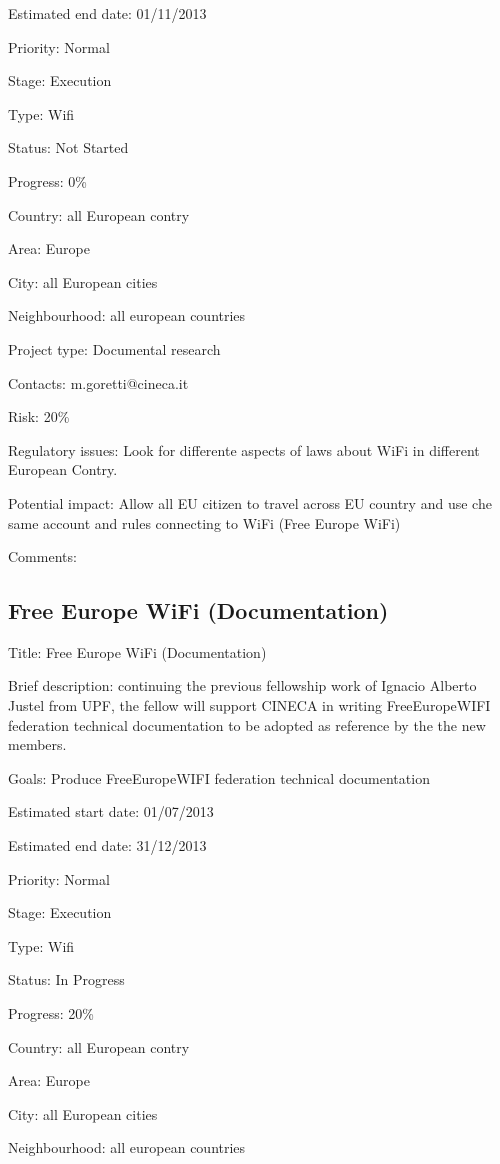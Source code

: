\documentclass[draftclsnofoot,12pt,journal,onecolumn]{IEEEtran}
\begin{document}
Estimated end date: 01/11/2013 

Priority: Normal 

Stage: Execution 

Type: Wifi 

Status: Not Started 

Progress: 0\% 

Country: all European contry 

Area: Europe 

City: all European cities 

Neighbourhood: all european countries 

Project type: Documental research 

Contacts: m.goretti@cineca.it

Risk: 20\% 

Regulatory issues: Look for differente aspects of laws about WiFi in 
different European Contry. 

Potential impact: Allow all EU citizen to travel across EU country and use 
che same account and rules connecting to WiFi (Free Europe WiFi) 

Comments: 

\subsection{Free Europe WiFi (Documentation)} 

Title: Free Europe WiFi (Documentation) 

Brief description: continuing the previous fellowship work of Ignacio Alberto 
Justel from UPF, the fellow will support CINECA in writing FreeEuropeWIFI 
federation technical documentation to be adopted as reference by the the new 
members. 

Goals: Produce  FreeEuropeWIFI federation technical documentation 

Estimated start date: 01/07/2013 

Estimated end date: 31/12/2013 

Priority: Normal 

Stage: Execution 

Type: Wifi 

Status: In Progress 

Progress: 20\% 

Country: all European contry 

Area: Europe 

City: all European cities 

Neighbourhood: all european countries 
\end{document}
